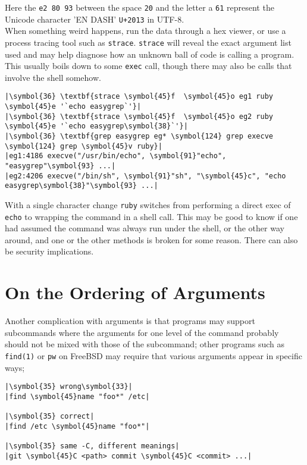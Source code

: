 \documentclass[10pt,a4paper]{article}
\begin{document}
Here the \texttt{e2 80 93} between the space \texttt{20} and the
letter a \texttt{61} represent the Unicode character 'EN DASH'
\texttt{U+2013} in UTF-8. \\

When something weird happens, run the data through a hex viewer, or use
a process tracing tool such as \texttt{strace}. \texttt{strace} will
reveal the exact argument list used and may help diagnose how an unknown
ball of code is calling a program. This usually boils down to some
\texttt{exec} call, though there may also be calls that involve the
shell somehow.

\begin{lstlisting}
|\symbol{36} \textbf{strace \symbol{45}f  \symbol{45}o eg1 ruby \symbol{45}e '`echo easygrep`'}|
|\symbol{36} \textbf{strace \symbol{45}f  \symbol{45}o eg2 ruby \symbol{45}e '`echo easygrep\symbol{38}`'}|
|\symbol{36} \textbf{grep easygrep eg* \symbol{124} grep execve \symbol{124} grep \symbol{45}v ruby}|
|eg1:4186 execve("/usr/bin/echo", \symbol{91}"echo", "easygrep"\symbol{93} ...|
|eg2:4206 execve("/bin/sh", \symbol{91}"sh", "\symbol{45}c", "echo easygrep\symbol{38}"\symbol{93} ...|
\end{lstlisting}

With a single character change \texttt{ruby} switches from performing a
direct exec of \texttt{echo} to wrapping the command in a shell call.
This may be good to know if one had assumed the command was always run
under the shell, or the other way around, and one or the other methods
is broken for some reason. There can also be security implications.

\section*{On the Ordering of Arguments}

Another complication with arguments is that programs may support
subcommands where the arguments for one level of the command probably
should not be mixed with those of the subcommand; other programs such as
\texttt{find(1)} or \texttt{pw} on FreeBSD may require that various
arguments appear in specific ways;

\begin{lstlisting}
|\symbol{35} wrong\symbol{33}|
|find \symbol{45}name "foo*" /etc|

|\symbol{35} correct|
|find /etc \symbol{45}name "foo*"|

|\symbol{35} same -C, different meanings|
|git \symbol{45}C <path> commit \symbol{45}C <commit> ...|
\end{lstlisting}
\end{document}
